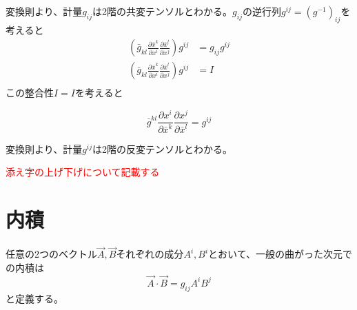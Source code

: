\documentclass[dvipdfmx]{report} %
\begin{document}
変換則より、計量$g_{ij}$は2階の共変テンソルとわかる。$g_{ij}$の逆行列$g^{ij} = (g^{-1})_{ij}$を考えると
\begin{equation*}
\begin{split}
	\left( \bar{g}_{kl} \frac{\partial \bar{x}^k}{\partial x^i} \frac{\partial \bar{x}^l}{\partial x^j} \right) g^{ij} &= g_{ij} g^{ij}\\
	\left( \bar{g}_{kl} \frac{\partial \bar{x}^k}{\partial x^i} \frac{\partial \bar{x}^l}{\partial x^j} \right) g^{ij} &= I\\
\end{split}
\end{equation*}
この整合性$I = I$を考えると
\begin{tcolorbox}[title=計量$g^{ij}$の変換則]
\[
\bar{g}^{kl} \frac{\partial x^i}{\partial \bar{x}^k} \frac{\partial x^j}{\partial \bar{x}^l} 
= g^{ij}
\]
\end{tcolorbox}
変換則より、計量$g^{ij}$は2階の反変テンソルとわかる。

\textcolor{red}{添え字の上げ下げについて記載する}


\section{内積}
任意の2つのベクトル$\vec{A}, \vec{B}$それぞれの成分$A^i, B^i$とおいて、一般の曲がった次元での内積は
\[
\vec{A} \cdot \vec{B} = g_{ij} A^i B^j
\]
と定義する。


\end{document}
